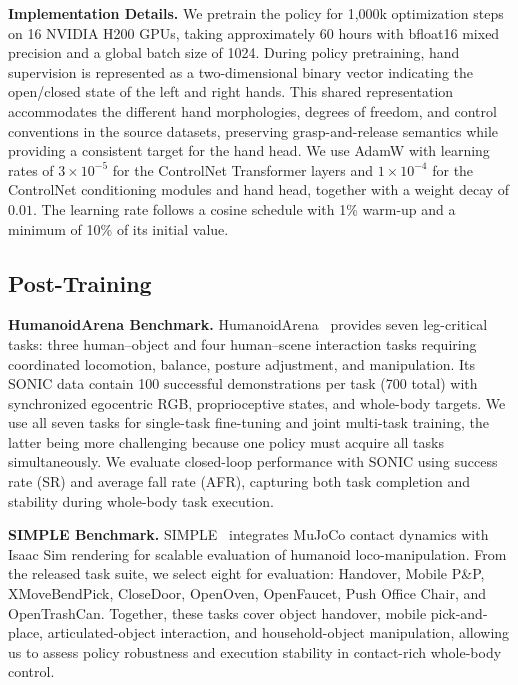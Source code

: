 \textbf{Implementation Details.} We pretrain the policy for 1,000k optimization steps on 16 NVIDIA H200 GPUs, taking approximately 60 hours with bfloat16 mixed precision and a global batch size of 1024. During policy pretraining, hand supervision is represented as a two-dimensional binary vector indicating the open/closed state of the left and right hands. This shared representation accommodates the different hand morphologies, degrees of freedom, and control conventions in the source datasets, preserving grasp-and-release semantics while providing a consistent target for the hand head. We use AdamW with learning rates of $3\times10^{-5}$ for the ControlNet Transformer layers and $1\times10^{-4}$ for the ControlNet conditioning modules and hand head, together with a weight decay of $0.01$. The learning rate follows a cosine schedule with 1\% warm-up and a minimum of 10\% of its initial value.

\subsection{Post-Training}
\label{sec:setup_posttraining}
\textbf{HumanoidArena Benchmark.} HumanoidArena~\citep{humanoidarena,sonic} provides seven leg-critical tasks: three human--object and four human--scene interaction tasks requiring coordinated locomotion, balance, posture adjustment, and manipulation. Its SONIC data contain 100 successful demonstrations per task (700 total) with synchronized egocentric RGB, proprioceptive states, and whole-body targets. We use all seven tasks for single-task fine-tuning and joint multi-task training, the latter being more challenging because one policy must acquire all tasks simultaneously. We evaluate closed-loop performance with SONIC using success rate (SR) and average fall rate (AFR), capturing both task completion and stability during whole-body task execution.

\textbf{SIMPLE Benchmark.} SIMPLE~\citep{simple} integrates MuJoCo contact dynamics with Isaac Sim rendering for scalable evaluation of humanoid loco-manipulation. From the released task suite, we select eight for evaluation: Handover, Mobile P\&P, XMoveBendPick, CloseDoor, OpenOven, OpenFaucet, Push Office Chair, and OpenTrashCan. Together, these tasks cover object handover, mobile pick-and-place, articulated-object interaction, and household-object manipulation, allowing us to assess policy robustness and execution stability in contact-rich whole-body control.

